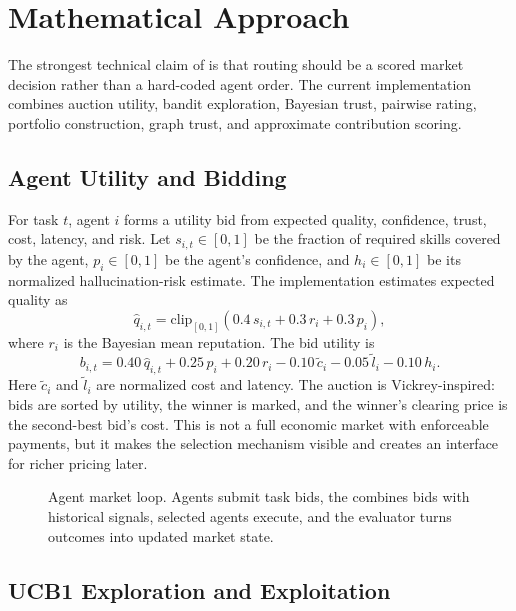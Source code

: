 \section{Mathematical Approach}

The strongest technical claim of \systemname{} is that routing should be a scored market decision rather than a hard-coded agent order. The current implementation combines auction utility, bandit exploration, Bayesian trust, pairwise rating, portfolio construction, graph trust, and approximate contribution scoring.

\subsection{Agent Utility and Bidding}

For task \(t\), agent \(i\) forms a utility bid from expected quality, confidence, trust, cost, latency, and risk. Let \(s_{i,t}\in[0,1]\) be the fraction of required skills covered by the agent, \(p_i\in[0,1]\) be the agent's confidence, and \(h_i\in[0,1]\) be its normalized hallucination-risk estimate. The implementation estimates expected quality as
\begin{equation}
\hat{q}_{i,t} =
\mathrm{clip}_{[0,1]}
\left(
0.4\,s_{i,t}
+0.3\,r_i
+0.3\,p_i
\right),
\end{equation}
where \(r_i\) is the Bayesian mean reputation. The bid utility is
\begin{equation}
b_{i,t} =
0.40\,\hat{q}_{i,t}
+0.25\,p_i
+0.20\,r_i
-0.10\,\tilde{c}_i
-0.05\,\tilde{l}_i
-0.10\,h_i.
\end{equation}
Here \(\tilde{c}_i\) and \(\tilde{l}_i\) are normalized cost and latency. The auction is Vickrey-inspired: bids are sorted by utility, the winner is marked, and the winner's clearing price is the second-best bid's cost. This is not a full economic market with enforceable payments, but it makes the selection mechanism visible and creates an interface for richer pricing later.

\begin{figure}[t]
\centering
{}
\caption{Agent market loop. Agents submit task bids, the \marketmaker{} combines bids with historical signals, selected agents execute, and the evaluator turns outcomes into updated market state.}
\label{fig:market-loop}
\end{figure}

\subsection{UCB1 Exploration and Exploitation}

